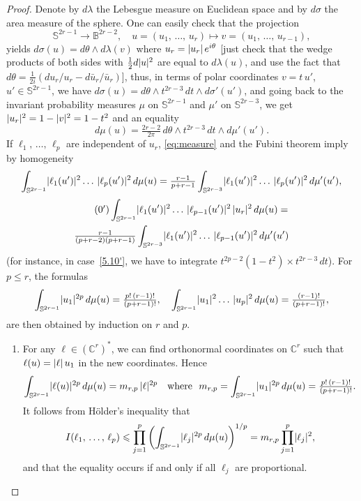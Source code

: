 \documentclass[AHL,Unicode,longabstracts,published]{cedram}
\DeclarePairedDelimiter{\abs}{\lvert}{\rvert}
\newcommand*\bC{\mathbb{C}}
\newcommand*\bS{\mathbb{S}}
\newcommand*\bB{\mathbb{B}}
\let\leq\leqslant
\begin{document}
\begin{proof}
Denote by $d\lambda$ the Lebesgue measure on Euclidean space and by $d\sigma$ the area measure of the sphere. One can easily check that the projection
\[
\bS^{2r-1}\to \bB^{2r-2},\quad u=\left(u_1,\,\dotsc,\,u_r\right)\mapsto v=\left(u_1,\,\dotsc,\,u_{r-1}\right),
\]
yields $d\sigma(u)=d\theta\wedge d\lambda(v)$ where $u_r=\abs{u_r}\,e^{i\theta}$ [just check that the wedge products of both sides with $\tfrac{1}{ 2}d\abs{u}^2$ are equal to $d\lambda(u)$, and use the fact that $d\theta=\tfrac{1}{ 2i}(du_r/u_r -d\bar u_r/\bar u_r)$], thus, in terms of polar coordinates $v=t\,u'$, $u'\in\bS^{2r-1}$, we have
$d\sigma(u)=d\theta\wedge t^{2r-3}\,dt\wedge d\sigma'(u')$, and going back to the invariant probability measures $\mu$ on $\bS^{2r-1}$ and $\mu'$ on $\bS^{2r-3}$, we get
$\abs{u_r}^2=1-\abs{v}^2=1-t^2$ and an equality
\begin{equation}\label{eq:measure}
d\mu(u)=\tfrac{2r-2}{ 2\pi}\,d\theta\wedge t^{2r-3}\,dt
\wedge d\mu'(u').
\end{equation}
If $\ell_1,\,\dotsc,\,\ell_p$ are independent of $u_r$, \eqref{eq:measure} and the Fubini theorem imply by homogeneity
\begin{align}\label{5.10}
\int_{\bS^{2r-1}}\abs{\ell_1(u')}^2\ldots\,\abs{\ell_p(u')}^2\,d\mu(u) =
\tfrac{r-1}{p+r-1}
\int_{\bS^{2r-3}}\abs{\ell_1(u')}^2\ldots\,\abs{\ell_p(u')}^2\,d\mu'(u'),
\end{align}
\begin{multline}\label{5.10'}
\tag{\theequation\ensuremath{'}}
\int_{\bS^{2r-1}}\abs{\ell_1(u')}^2\ldots\,\abs{\ell_{p-1}(u')}^2\,\abs{u_r}^2\,d\mu(u) =
\\
\tfrac{r-1}{(p+r-2)(p+r-1)} \int_{\bS^{2r-3}}\abs{\ell_1(u')}^2\ldots\,\abs{\ell_{p-1}(u')}^2\,d\mu'(u')
\end{multline}
(for instance, in case~\eqref{5.10'}, we have to integrate $t^{2p-2}(1-t^2)\times t^{2r-3}\,dt$). For $p\leq r$, the formulas
\[
\int_{\bS^{2r-1}}\abs{u_1}^{2p}\,d\mu(u)=\tfrac{p!\,(r-1)!}{ (p+r-1)!},\quad
\int_{\bS^{2r-1}}\abs{u_1}^2\ldots\,\abs{u_p}^2\,d\mu(u)=\tfrac{(r-1)!}{ (p+r-1)!},
\]
are then obtained by induction on $r$ and $p$.
\begin{enumerate}
\item For any $\ell\in(\bC^r)^*$, we can find orthonormal coordinates on $\bC^r$ such that $\ell(u)=\abs{\ell}\,u_1$ in the new coordinates. Hence
\[
\int_{\bS^{2r-1}}\abs{\ell(u)}^{2p}\,d\mu(u)=m_{r,p}\,\abs{\ell}^{2p}\quad
\text{where}~~m_{r,p}=\int_{\bS^{2r-1}}\abs{u_1}^{2p}\,d\mu(u)=
\tfrac{p!\,(r-1)!}{ (p+r-1)!}.
\]
It follows from H\"older's inequality that
\[
I(\ell_1,\,\dotsc,\,\ell_p)\leq \prod_{j=1}^p
\left(\int_{\bS^{2r-1}}\abs{\ell_j}^{2p}\,d\mu(u)\right)^{1/p}=m_{r,p}
\prod_{j=1}^p\abs{\ell_j}^2,
\]
and that the equality occurs if and only if all $\ell_j$ are proportional.


\end{enumerate}
\end{proof}
\end{document}
